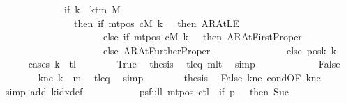 \begin{isabellebody}
\ \ \ \ \ \ \ \ \ \ \ \ {\isacharequal}{\kern0pt}\ {\isacharparenleft}{\kern0pt}if\ k\ {\isacharless}{\kern0pt}\ k{\isacharunderscore}{\kern0pt}tm\ M\isanewline
\ \ \ \ \ \ \ \ \ \ \ \ \ \ \ then\ {\isacharparenleft}{\kern0pt}if\ mt{\isacharunderscore}{\kern0pt}pos\ cM\ k\ {\isacharequal}{\kern0pt}\ {}\ then\ AR{\isacharunderscore}{\kern0pt}AtLE\isanewline
\ \ \ \ \ \ \ \ \ \ \ \ \ \ \ \ \ \ \ \ \ else\ if\ mt{\isacharunderscore}{\kern0pt}pos\ cM\ k\ {\isacharequal}{\kern0pt}\ {}\ then\ AR{\isacharunderscore}{\kern0pt}AtFirstProper\isanewline
\ \ \ \ \ \ \ \ \ \ \ \ \ \ \ \ \ \ \ \ \ else\ AR{\isacharunderscore}{\kern0pt}AtFurtherProper{\isacharparenright}{\kern0pt}\isanewline
\ \ \ \ \ \ \ \ \ \ \ \ \ \ \ else\ posk{}\ k{\isacharparenright}{\kern0pt}{\isachardoublequoteclose}\isanewline
\ \ \ \ \isamarkupfalse%
\ {\isacharparenleft}{\kern0pt}cases\ {\isachardoublequoteopen}k\ {\isacharequal}{\kern0pt}\ {\isacharquery}{\kern0pt}tl{\isachardoublequoteclose}{\isacharparenright}{\kern0pt}\isanewline
\ \ \ \ \ \ \isamarkupfalse%
\ True\ \isamarkupfalse%
\ {\isacharquery}{\kern0pt}thesis\ \isamarkupfalse%
\ tl{\isacharunderscore}{\kern0pt}eq\ m{}lt\ \isamarkupfalse%
\ simp\isanewline
\ \ \ \ \isamarkupfalse%
\isanewline
\ \ \ \ \ \ \isamarkupfalse%
\ False\isanewline
\ \ \ \ \ \ \isamarkupfalse%
\ kne{\isacharcolon}{\kern0pt}\ {\isachardoublequoteopen}k\ {\isasymnoteq}\ {\isacharquery}{\kern0pt}m{}{\isachardoublequoteclose}\ \isamarkupfalse%
\ tl{\isacharunderscore}{\kern0pt}eq\ \isamarkupfalse%
\ simp\isanewline
\ \ \ \ \ \ \isamarkupfalse%
\ {\isacharquery}{\kern0pt}thesis\ \isamarkupfalse%
\ False\ kne\ cond{\isacharbrackleft}{\kern0pt}OF\ kne{\isacharbrackright}{\kern0pt}\ \isamarkupfalse%
\ {\isacharparenleft}{\kern0pt}simp\ add{\isacharcolon}{\kern0pt}\ k{\isacharunderscore}{\kern0pt}idx{\isacharunderscore}{\kern0pt}def{\isacharparenright}{\kern0pt}\isanewline
\ \ \ \ \isamarkupfalse%
\isanewline
\ \ \isamarkupfalse%
\isanewline
\ \ \isamarkupfalse%
\ ps{\isacharunderscore}{\kern0pt}full{\isacharcolon}{\kern0pt}\ {\isachardoublequoteopen}{\isacharparenleft}{\kern0pt}mt{\isacharunderscore}{\kern0pt}pos\ c{}{\isacharparenright}{\kern0pt}{\isacharparenleft}{\kern0pt}{\isacharquery}{\kern0pt}tl\ {\isacharcolon}{\kern0pt}{\isacharequal}{\kern0pt}\ if\ {\isacharquery}{\kern0pt}p\ {\isacharequal}{\kern0pt}\ {}\ then\ Suc\ {}\isanewline

\end{isabellebody}
